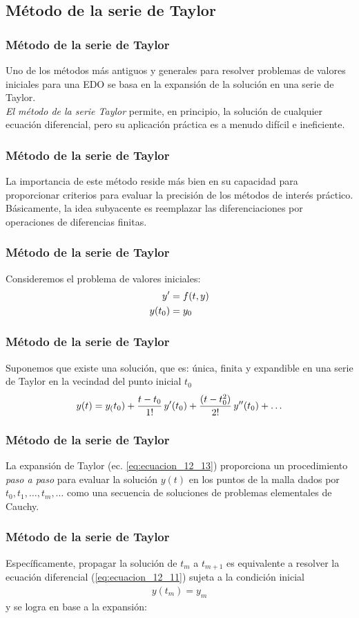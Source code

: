 \subsection{Método de la serie de Taylor}
\begin{frame}
\frametitle{Método de la serie de Taylor}
Uno de los métodos más antiguos y generales para resolver problemas de valores iniciales para una EDO se basa en la expansión de la solución en una serie de Taylor.
\\
\bigskip
\emph{El método de la serie Taylor} permite, en principio, la solución de cualquier ecuación diferencial, pero su aplicación práctica es a menudo difícil e ineficiente.
\end{frame}
\begin{frame}
\frametitle{Método de la serie de Taylor}
La importancia de este método reside más bien en su capacidad para proporcionar criterios para evaluar la precisión de los métodos de interés práctico.
\\
\bigskip
Básicamente, la idea subyacente es reemplazar las diferenciaciones por operaciones de diferencias finitas.
\end{frame}
\begin{frame}
\frametitle{Método de la serie de Taylor}
Consideremos el problema de valores iniciales:
\begin{align}
{y}^{\prime} &= f(t, y) \label{eq:ecuacion_12_11} \\
y(t_{0}) &= y_{0} \label{eq:ecuacion_12_12}
\end{align}
\end{frame}
\begin{frame}
\frametitle{Método de la serie de Taylor}
Suponemos que existe una solución, que es: única, finita y expandible en una serie de Taylor en la vecindad del punto inicial $t_{0}$
\begin{align}
y(t) = y_(t_{0}) + \dfrac{t - t_{0}}{1!} \, {y}^{\prime} (t_{0}) + \dfrac{(t - t_{0}^{2})}{2!} \, {y}^{\prime \prime} (t_{0}) + \ldots
\label{eq:ecuacion_12_13}
\end{align}
\end{frame}
\begin{frame}
\frametitle{Método de la serie de Taylor}
La expansión de Taylor (ec. \ref{eq:ecuacion_12_13}) proporciona un procedimiento \emph{paso a paso} para evaluar la solución $y (t)$ en los puntos de la malla dados por $t_{0}, t_{1}, \ldots, t_{m}, \ldots$ como una secuencia de soluciones de problemas elementales de Cauchy.
\end{frame}
\begin{frame}
\frametitle{Método de la serie de Taylor}
Específicamente, propagar la solución de $t_{m}$ a $t_{m + 1}$ es equivalente a resolver la ecuación diferencial (\ref{eq:ecuacion_12_11}) sujeta a la condición inicial
\begin{align*}
y(t_{m}) = y_{m}
\end{align*}
y se logra en base a la expansión:
\end{frame}
